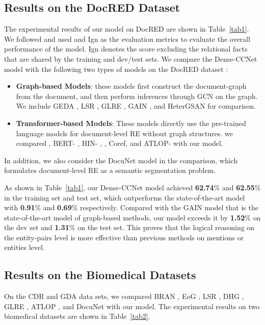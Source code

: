 \documentclass[11pt]{article}
\begin{document}
\subsection{Results on the DocRED Dataset}
The experimental results of our model on DocRED are shown in Table~\ref{tab1}. We followed \cite{c:104} and used  and Ign as the evaluation metrics to evaluate the overall performance of the model. Ign denotes the  score excluding the relational facts that are shared by the training and dev/test sets. We compare the Dense-CCNet model with the following two types of models on the DocRED dataset :
\begin{itemize}
    \item \textbf{Graph-based Models}: these models first construct the document-graph from the document, and then perform inferences through GCN \cite{c:110} on the graph. We include GEDA \cite{c:130}, LSR \cite{c:106}, GLRE \cite{c:108}, GAIN \cite{c:105}, and HeterGSAN \cite{c:134} for comparison.
    
    \item \textbf{Transformer-based Models}: These models directly use the pre-trained language models for document-level RE without graph structures. we compared  \cite{c:135}, BERT- \cite{c:135}, HIN- \cite{c:111},  \cite{c:146}, Coref\cite{c:146}, and ATLOP- \cite{c:112} with our model.
\end{itemize}
In addition, we also consider the DocuNet \cite{c:113} model in the comparison, which formulates document-level RE as a semantic segmentation problem. 


As shown in Table~\ref{tab1}, our Dense-CCNet model achieved \textbf{62.74}\%  and \textbf{62.55}\%  in the training set and test set, which outperforms the state-of-the-art model with \textbf{0.91}\%  and \textbf{0.69}\%  respectively.
Compared with the GAIN model that is the state-of-the-art model of graph-based methods, our model exceeds it by \textbf{1.52}\%  on the dev set and \textbf{1.31}\%  on the test set.
This proves that the logical reasoning on the entity-pairs level is more effective than previous methods on mentions or entities level.


\subsection{Results on the Biomedical Datasets}


On the CDR and GDA data sets, we compared BRAN \cite{c:137}, EoG \cite{c:107}, LSR \cite{c:106}, DHG \cite{c:139}, GLRE \cite{c:108}, ATLOP \cite{c:112}, and DocuNet \cite{c:113} with our model.
The experimental results on two biomedical datasets are shown in Table~\ref{tab2}.
\end{document}
